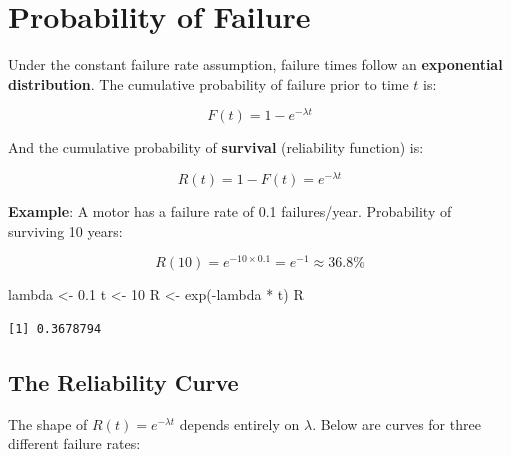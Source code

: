 \documentclass[
  letterpaper,
  DIV=11,
  numbers=noendperiod]{scrreprt}
\newenvironment{Shaded}{\begin{snugshade}}{\end{snugshade}}
\newcommand{\DecValTok}[1]{\textcolor[rgb]{0.68,0.00,0.00}{#1}}
\newcommand{\FloatTok}[1]{\textcolor[rgb]{0.68,0.00,0.00}{#1}}
\newcommand{\FunctionTok}[1]{\textcolor[rgb]{0.28,0.35,0.67}{#1}}
\newcommand{\NormalTok}[1]{\textcolor[rgb]{0.00,0.23,0.31}{#1}}
\newcommand{\OtherTok}[1]{\textcolor[rgb]{0.00,0.23,0.31}{#1}}
\newcommand{\SpecialCharTok}[1]{\textcolor[rgb]{0.37,0.37,0.37}{#1}}
\begin{document}
\section{Probability of Failure}\label{probability-of-failure}

Under the constant failure rate assumption, failure times follow an
\textbf{exponential distribution}. The cumulative probability of failure
prior to time \(t\) is:

\[F(t) = 1 - e^{-\lambda t}\]

And the cumulative probability of \textbf{survival} (reliability
function) is:

\[R(t) = 1 - F(t) = e^{-\lambda t}\]

\textbf{Example}: A motor has a failure rate of 0.1 failures/year.
Probability of surviving 10 years:

\[R(10) = e^{-10 \times 0.1} = e^{-1} \approx 36.8\%\]

\begin{Shaded}
\begin{Highlighting}[]
\NormalTok{lambda }\OtherTok{\textless{}{-}} \FloatTok{0.1}
\NormalTok{t      }\OtherTok{\textless{}{-}} \DecValTok{10}
\NormalTok{R }\OtherTok{\textless{}{-}} \FunctionTok{exp}\NormalTok{(}\SpecialCharTok{{-}}\NormalTok{lambda }\SpecialCharTok{*}\NormalTok{ t)}
\NormalTok{R}
\end{Highlighting}
\end{Shaded}

\begin{verbatim}
[1] 0.3678794
\end{verbatim}

\subsection{The Reliability Curve}\label{the-reliability-curve}

The shape of \(R(t) = e^{-\lambda t}\) depends entirely on \(\lambda\).
Below are curves for three different failure rates:
\end{document}
